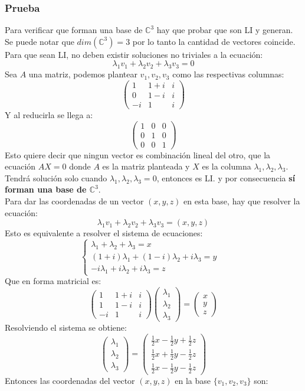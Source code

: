 \documentclass[a4paper,12pt]{article}
\begin{document}
\subsubsection{Prueba}
Para verificar que forman una base de $\mathbb{C}^3$ hay que probar que son LI y generan. Se puede notar que $dim(\mathbb{C}^3)=3$ por lo tanto la cantidad de vectores coincide. \\
Para que sean LI, no deben existir soluciones no triviales a la ecuación:
$$
\lambda_1v_1+\lambda_2v_2+\lambda_3v_3=0
$$
Sea $A$ una matriz, podemos plantear $v_1,v_2,v_3$ como las respectivas columnas:
$$
\begin{pmatrix}
1 & 1+i & i\\ 
0 & 1-i & i\\ 
-i & 1 & i
\end{pmatrix}
$$
Y al reducirla se llega a:
$$
\begin{pmatrix}
1 & 0 & 0\\ 
0 & 1 & 0\\ 
0 & 0 & 1
\end{pmatrix}
$$
Esto quiere decir que ningun vector es combinación lineal del otro, que la ecuación $AX=0$ donde $A$ es la matriz planteada y $X$ es la columna $\lambda_1, \lambda_2, \lambda_3$. Tendrá solución solo cuando $\lambda_1, \lambda_2, \lambda_3=0$, entonces es LI. y por consecuencia \textbf{sí forman una base de $\mathbb{C}^3$}. \\
Para dar las coordenadas de un vector $(x,y,z)$ en esta base, hay que resolver la ecuación:
$$
\lambda_1v_1+\lambda_2v_2+\lambda_3v_3=(x,y,z)
$$
Esto es equivalente a resolver el sistema de ecuaciones:
$$
\begin{cases}
    \lambda_1+\lambda_2+\lambda_3=x & \\
    (1+i)\lambda_1+(1-i)\lambda_2+i\lambda_3=y & \\
    -i\lambda_1+i\lambda_2+i\lambda_3=z
\end{cases}
$$
Que en forma matricial es:
$$
\begin{pmatrix}
1 & 1+i & i\\
1 & 1-i & i\\
-i & 1 & i
\end{pmatrix}
\begin{pmatrix}
\lambda_1\\
\lambda_2\\
\lambda_3
\end{pmatrix}
=
\begin{pmatrix}
x\\
y\\
z
\end{pmatrix}
$$
Resolviendo el sistema se obtiene:
$$
\begin{pmatrix}
\lambda_1\\
\lambda_2\\
\lambda_3
\end{pmatrix}
=
\begin{pmatrix}
\frac{1}{2}x-\frac{1}{2}y+\frac{1}{2}z\\
\frac{1}{2}x+\frac{1}{2}y-\frac{1}{2}z\\
\frac{1}{2}x-\frac{1}{2}y-\frac{1}{2}z
\end{pmatrix}
$$
Entonces las coordenadas del vector $(x,y,z)$ en la base $\{v_1,v_2,v_3\}$ son:
\end{document}

